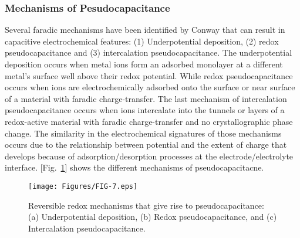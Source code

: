 \documentclass[reprint,amsmath,amssymb,aps,floatfix,
]{revtex4-2}
\begin{document}
\subsubsection{Mechanisms of Pesudocapacitance}
Several faradic mechanisms have been identified by Conway that can result in capacitive electrochemical features: (1) Underpotential deposition, (2) redox pseudocapacitance and (3) intercalation pseudocapacitance. The underpotential deposition occurs when metal ions form an adsorbed monolayer at a different metal's surface well above their redox potential. While redox pseudocapacitance occurs when ions are electrochemically adsorbed onto the surface or near surface of a material with faradic charge-transfer. The last mechanism of intercalation pseudocapacitance occurs when ions intercalate into the tunnels or layers of a redox-active material with faradic charge-transfer and no crystallographic phase change. The similarity in the electrochemical signatures of those mechanisms occurs due to the relationship between potential and the extent of charge that develops because of adsorption/desorption processes at the electrode/electrolyte interface. [Fig.~\ref{fig:fig7}] shows the different mechanisms of pseudocapacitacne.
\begin{figure}[b]
    \centering
    \texttt{[image: Figures/FIG-7.eps]}
    \caption{\label{fig:fig7}Reversible redox mechanisms that give rise to pseudocapacitance: (a) Underpotential deposition, (b) Redox pseudocapacitance, and (c) Intercalation pseudocapacitance.}
    \end{figure}
\end{document}
